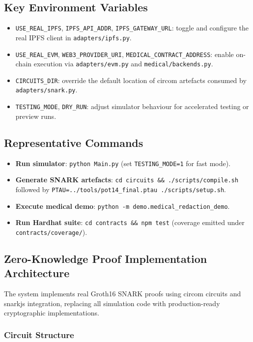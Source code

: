 \subsection{Key Environment Variables}
\begin{itemize}
    \item \texttt{USE\_REAL\_IPFS}, \texttt{IPFS\_API\_ADDR}, \texttt{IPFS\_GATEWAY\_URL}: toggle and configure the real IPFS client in \texttt{adapters/ipfs.py}.
    \item \texttt{USE\_REAL\_EVM}, \texttt{WEB3\_PROVIDER\_URI}, \texttt{MEDICAL\_CONTRACT\_ADDRESS}: enable on-chain execution via \texttt{adapters/evm.py} and \texttt{medical/backends.py}.
    \item \texttt{CIRCUITS\_DIR}: override the default location of circom artefacts consumed by \texttt{adapters/snark.py}.
    \item \texttt{TESTING\_MODE}, \texttt{DRY\_RUN}: adjust simulator behaviour for accelerated testing or preview runs.
\end{itemize}

\subsection{Representative Commands}
\begin{itemize}
    \item \textbf{Run simulator}: \texttt{python Main.py} (set \texttt{TESTING\_MODE=1} for fast mode).
    \item \textbf{Generate SNARK artefacts}: \texttt{cd circuits \&\& ./scripts/compile.sh} followed by \texttt{PTAU=../tools/pot14\_final.ptau ./scripts/setup.sh}.
    \item \textbf{Execute medical demo}: \texttt{python -m demo.medical\_redaction\_demo}.
    \item \textbf{Run Hardhat suite}: \texttt{cd contracts \&\& npm test} (coverage emitted under \texttt{contracts/coverage/}).
\end{itemize}

\subsection{Zero-Knowledge Proof Implementation Architecture}

The system implements real Groth16 SNARK proofs using circom circuits and snarkjs integration, replacing all simulation code with production-ready cryptographic implementations.

\subsubsection{Circuit Structure}

